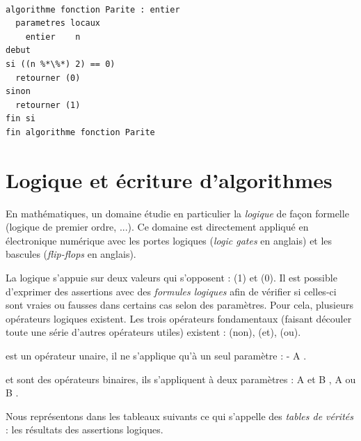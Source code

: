 \documentclass[11pt,a4paper]{article}
\begin{document}
\bigskip


\begin{center}

\begin{lstlisting}[style=algorithmique]

algorithme fonction Parite : entier
  parametres locaux
    entier    n
debut
si ((n %*\%*) 2) == 0)
  retourner (0)
sinon
  retourner (1)
fin si
fin algorithme fonction Parite
\end{lstlisting}

\end{center}


\vfillLast

\newpage


\section{Logique et écriture d'algorithmes}

\bigskip

En mathématiques, un domaine étudie en particulier la \textit{logique} de façon formelle (logique de premier ordre, ...).
Ce domaine est directement appliqué en électronique numérique avec les portes logiques (\textit{logic gates} en anglais) et les bascules (\textit{flip-flops} en anglais).

\medskip

La logique s'appuie sur deux valeurs qui s'opposent :  (1) et  (0).
Il est possible d'exprimer des assertions avec des \textit{formules logiques} afin de vérifier si celles-ci sont vraies ou fausses dans certains cas selon des paramètres.
Pour cela, plusieurs opérateurs logiques existent.
Les trois opérateurs fondamentaux (faisant découler toute une série d'autres opérateurs utiles) existent :  (non),  (et),  (ou).

\medskip

 est un opérateur unaire, il ne s'applique qu'à un seul paramètre : \og - A \fg{}.

 et  sont des opérateurs binaires, ils s'appliquent à deux paramètres : \og A et B \fg{}, \og A ou B \fg{}.

Nous représentons dans les tableaux suivants ce qui s'appelle des \textit{tables de vérités} : les résultats des assertions logiques.

\bigskip
\end{document}
